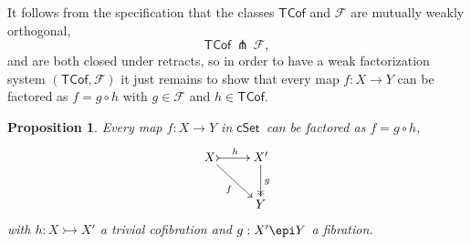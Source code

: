 \documentclass[12pt]{article}
\newcommand{\cSet}{\ensuremath{\mathsf{cSet}}}
\newcommand{\mono}{\ensuremath{\rightarrowtail}}
\newcommand{\ra}{\ensuremath{\rightarrow}}
\newtheorem{proposition}[theorem]{Proposition}
\theoremstyle{remark}
\theoremstyle{definition}
\begin{document}
It follows from the specification that the classes $\mathsf{TCof}$ and $\mathcal{F}$ are mutually weakly orthogonal,
\[
\mathsf{TCof}\, {\pitchfork}\, \mathcal{F},
\]
and are both closed under retracts, so in order to have a weak factorization system $(\mathsf{TCof}, \mathcal{F})$  it just remains to show that every map $f: X\ra Y$ can be factored as $f  = g\circ h$ with $g\in \mathcal{F}$ and $h\in \mathsf{TCof}$.

\begin{proposition}
Every map $f: X\ra Y$ in \cSet\ can be factored as $f  = g\circ h$,
\begin{equation}%
\xymatrix{
X \ar[rd]_{f} \ar@{>->}[r]^h & X'\ar@{->>}[d]^g\\
& Y
}
\end{equation}
with $h: X\mono X'$ a trivial cofibration and $g: X'\epi Y$ a fibration.
\end{proposition}
\end{document}
